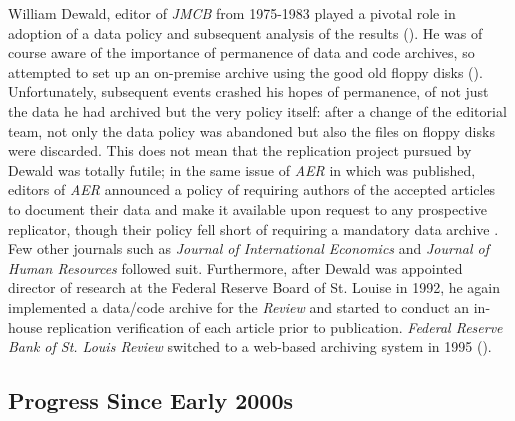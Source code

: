 \documentclass[11pt]{article}
\begin{document}
William Dewald, editor of \textit{JMCB} from 1975-1983 played a pivotal role in adoption of a data policy and subsequent analysis of the results (\cite{dewald1986replication}). He was of course aware of the importance of permanence of data and code archives, so attempted to set up an on-premise archive using the good old floppy disks (\cite{mccullough2006lessons}). Unfortunately, subsequent events crashed his hopes of permanence, of not just the data he had archived but the very policy itself: after a change of the editorial team, not only the data policy was abandoned but also the files on floppy disks were discarded. This does not mean that the replication project pursued by Dewald was totally futile; in the same issue of \textit{AER} in which \cite{dewald1986replication} was published, editors of \textit{AER} announced a policy of requiring authors of the accepted articles to document their data and make it available upon request to any prospective replicator, though their policy fell short of requiring a mandatory data archive \cite{ashenfelter1986}. Few other journals such as \textit{Journal of International Economics} and \textit{Journal of Human Resources} followed suit. Furthermore, after Dewald was appointed director of research at the Federal Reserve Board of St. Louise in 1992, he again implemented a data/code archive for the \textit{Review} and started to conduct an in-house replication verification of each article prior to publication. \textit{Federal Reserve Bank of St. Louis Review} switched to a web-based archiving system in 1995 (\cite{anderson2008role}).

\subsection{Progress Since Early 2000s}
\end{document}
